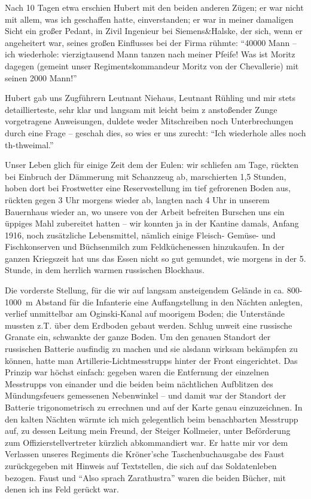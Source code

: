 \documentclass[a5paper,pagesize,10pt,twoside=true]{scrbook}
\begin{document}
Nach 10 Tagen etwa erschien Hubert mit den beiden anderen Zügen; er war nicht mit allem, was ich geschaffen hatte, einverstanden; er war in meiner damaligen Sicht ein großer Pedant, in Zivil Ingenieur bei Siemens\&Halske, der sich, wenn er angeheitert war, seines großen Einflusses bei der Firma rühmte: \enquote{\num{40000} Mann -- ich wiederhole: vierzigtausend Mann tanzen nach meiner Pfeife! Was ist Moritz dagegen (gemeint unser Regimentskommandeur Moritz von der Chevallerie) mit seinen \num{2000} Mann!}

Hubert gab uns Zugführern Leutnant Niehaus, Leutnant Rühling und mir stets detaillierteste, sehr klar und langsam mit leicht beim z anstoßender Zunge vorgetragene Anweisungen, duldete weder Mitschreiben noch Unterbrechungen durch eine Frage -- geschah dies, so wies er uns zurecht: \enquote{Ich wiederhole alles noch th-thweimal.}

Unser Leben glich für einige Zeit dem der Eulen: wir schliefen am Tage, rückten bei Einbruch der Dämmerung mit Schanzzeug ab, marschierten 1,5 Stunden, hoben dort bei Frostwetter eine Reservestellung im tief gefrorenen Boden aus, rückten gegen 3 Uhr morgens wieder ab, langten nach 4 Uhr in unserem Bauernhaus wieder an, wo unsere von der Arbeit befreiten Burschen uns ein üppiges Mahl zubereitet hatten -- wir konnten ja in der Kantine damals, Anfang 1916, noch zusätzliche Lebensmittel, nämlich einige Fleisch- Gemüse- und Fischkonserven und Büchsenmilch zum Feldküchenessen hinzukaufen. In der ganzen Kriegszeit hat uns das Essen nicht so gut gemundet, wie morgens in der 5. Stunde, in dem herrlich warmen russischen Blockhaus.

Die vorderste Stellung, für die wir auf langsam ansteigendem Gelände in ca. 800-1000~m Abstand für die Infanterie eine Auffangstellung in den Nächten anlegten, verlief unmittelbar am Oginski-Kanal auf moorigem Boden; die Unterstände mussten z.T. über dem Erdboden gebaut werden. Schlug unweit eine russische Granate ein, schwankte der ganze Boden. Um den genauen Standort der russischen Batterie ausfindig zu machen und sie alsdann wirksam bekämpfen zu können, hatte man Artillerie-Lichtmesstrupps hinter der Front eingerichtet. Das Prinzip war höchst einfach: gegeben waren die Entfernung der einzelnen Messtrupps von einander und die beiden beim nächtlichen Aufblitzen des Mündungsfeuers gemessenen Nebenwinkel -- und damit war der Standort der Batterie trigonometrisch zu errechnen und auf der Karte genau einzuzeichnen. In den kalten Nächten wärmte ich mich gelegentlich beim benachbarten Messtrupp auf, zu dessen Leitung mein Freund, der Steiger Kollmeier, unter Beförderung zum Offizierstellvertreter kürzlich abkommandiert war. Er hatte mir vor dem Verlassen unseres Regiments die Kröner'sche Taschenbuchausgabe des Faust zurückgegeben mit Hinweis auf Textstellen, die sich auf das Soldatenleben bezogen. Faust und \enquote{Also sprach Zarathustra} waren die beiden Bücher, mit denen ich ins Feld gerückt war.
\end{document}
